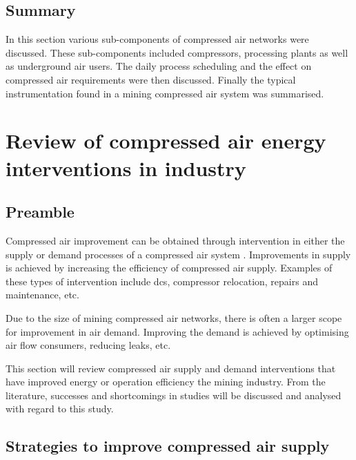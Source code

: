 \subsection{Summary}
In this section various sub-components of compressed air networks were discussed. These sub-components included compressors, processing plants as well as underground air users. The daily process scheduling and the effect on compressed air requirements were then discussed. Finally the typical instrumentation found in a mining compressed air system was summarised.
\section{Review of compressed air energy interventions in industry}
	\subsection{Preamble}
		Compressed air improvement can be obtained through intervention in either the supply or demand processes of a compressed air system \cite{Kriel2014Masters}. Improvements in supply is achieved by increasing the efficiency of compressed air supply. Examples of these types of intervention include \gls{dcs}, compressor relocation, repairs and maintenance, etc. 
		\par
		Due to the size of mining compressed air networks, there is often a larger scope for improvement in air demand. Improving the demand is achieved by optimising air flow consumers, reducing leaks, etc.
		\par
	 	 This section will review compressed air supply and demand interventions that have improved energy or operation efficiency the mining industry. From the literature, successes and shortcomings in studies will be discussed and analysed with regard to this study.
	 	
	\subsection{Strategies to improve compressed air supply}

